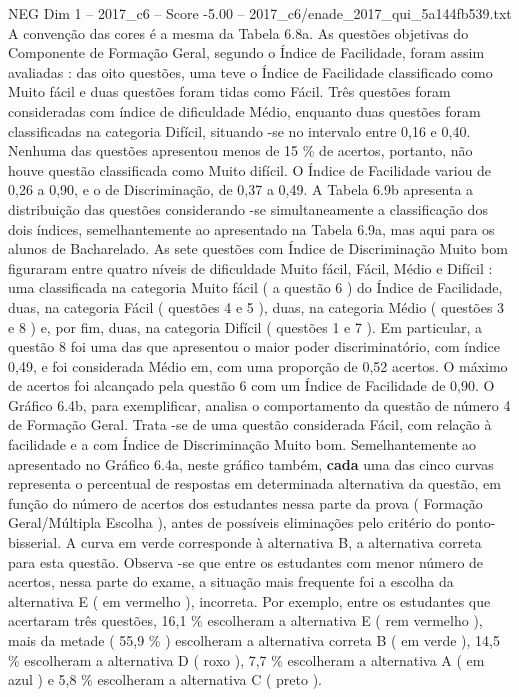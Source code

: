 \begin{textsample}{NEG Dim 1 – 2017\_c6 – Score -5.00 – 2017\_c6/enade\_2017\_qui\_5a144fb539.txt}
A convenção das cores é a mesma da Tabela 6.8a.
As questões objetivas do Componente de Formação Geral, segundo o Índice de Facilidade, foram assim avaliadas : das oito questões, uma teve o Índice de Facilidade classificado como Muito fácil e duas questões foram tidas como Fácil.
Três questões foram consideradas com índice de dificuldade Médio, enquanto duas questões foram classificadas na categoria Difícil, situando -se no intervalo entre 0,16 e 0,40.
Nenhuma das questões apresentou menos de 15 \% de acertos, portanto, não houve questão classificada como Muito difícil.
O Índice de Facilidade variou de 0,26 a 0,90, e o de Discriminação, de 0,37 a 0,49.
A Tabela 6.9b apresenta a distribuição das questões considerando -se simultaneamente a classificação dos dois índices, semelhantemente ao apresentado na Tabela 6.9a, mas aqui para os alunos de Bacharelado.
As sete questões com Índice de Discriminação Muito bom figuraram entre quatro níveis de dificuldade Muito fácil, Fácil, Médio e Difícil : uma classificada na categoria Muito fácil ( a questão 6 ) do Índice de Facilidade, duas, na categoria Fácil ( questões 4 e 5 ), duas, na categoria Médio ( questões 3 e 8 ) e, por fim, duas, na categoria Difícil ( questões 1 e 7 ).
Em particular, a questão 8 foi uma das que apresentou o maior poder discriminatório, com índice 0,49, e foi considerada Médio em, com uma proporção de 0,52 acertos.
O máximo de acertos foi alcançado pela questão 6 com um Índice de Facilidade de 0,90.
O Gráfico 6.4b, para exemplificar, analisa o comportamento da questão de número 4 de Formação Geral.
Trata -se de uma questão considerada Fácil, com relação à facilidade e a com Índice de Discriminação Muito bom.
Semelhantemente ao apresentado no Gráfico 6.4a, neste gráfico também, \textbf{cada} uma das cinco curvas representa o percentual de respostas em determinada alternativa da questão, em função do número de acertos dos estudantes nessa parte da prova ( Formação Geral/Múltipla Escolha ), antes de possíveis eliminações pelo critério do ponto-bisserial.
A curva em verde corresponde à alternativa B, a alternativa correta para esta questão.
Observa -se que entre os estudantes com menor número de acertos, nessa parte do exame, a situação mais frequente foi a escolha da alternativa E ( em vermelho ), incorreta.
Por exemplo, entre os estudantes que acertaram três questões, 16,1 \% escolheram a alternativa E ( rem vermelho ), mais da metade ( 55,9 \% ) escolheram a alternativa correta B ( em verde ), 14,5 \% escolheram a alternativa D ( roxo ), 7,7 \% escolheram a alternativa A ( em azul ) e 5,8 \% escolheram a alternativa C ( preto ).

\end{textsample}
